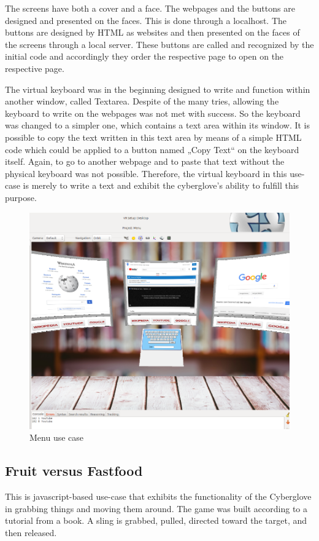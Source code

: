 The screens have both a cover and a face. The webpages and the buttons are designed and presented on the faces. This is done through a localhost. The buttons are designed by HTML as websites and then presented on the faces of the screens through a local server. These buttons are called and recognized by the initial code and accordingly they order the respective page to open on the respective page.

The virtual keyboard was in the beginning designed to write and function within another window, called Textarea. Despite of the many tries, allowing the keyboard to write on the webpages was not met with success. So the keyboard was changed to a simpler one, which contains a text area within its window. It is possible to copy the text written in this text area by means of a simple HTML code which could be applied to a button named „Copy Text“ on the keyboard itself. Again, to go to another webpage and to paste that text without the physical keyboard was not possible. Therefore, the virtual keyboard in this use-case is merely to write a text and exhibit the cyberglove’s ability to fulfill this purpose.

\begin{figure}[!h]
	\centering
	\includegraphics[width=.8\textwidth]{./images/shant/image1.png}
	\caption{Menu use case}
\end{figure}

\subsection{Fruit versus Fastfood}

This is javascript-based use-case that exhibits the functionality of the Cyberglove in grabbing things and moving them around. The game was built according to a tutorial from a book. A sling is grabbed, pulled, directed toward the target, and then released.

